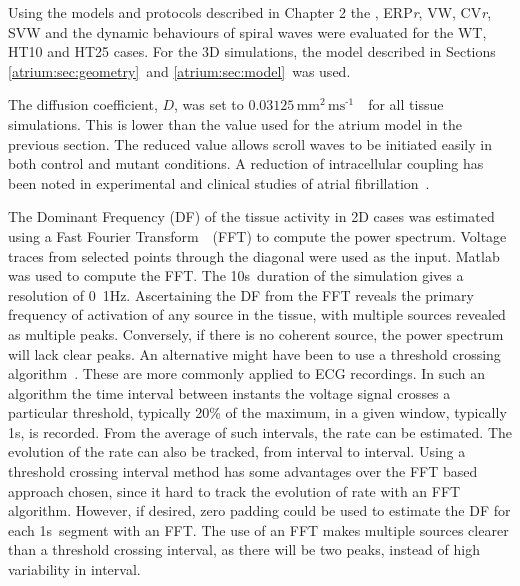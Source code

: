 Using the models and protocols described in Chapter 2 the \apdr, ERP\emph{r}, VW,
CV\emph{r}, SVW and the dynamic behaviours of spiral waves were evaluated for
the WT, HT10 and HT25 cases.
For the 3D simulations, the model described in Sections
\ref{atrium:sec:geometry}\ and \ref{atrium:sec:model}\ was used.

The diffusion coefficient, $D$, was set to
$0.03125\,\text{mm}^{\text{2}}\,\text{ms}^{\text{-1}}$~\cite{Biktasheva2005}\
for all tissue simulations.
This is lower than the value used for the atrium model in the previous section.
The reduced value allows scroll waves to be initiated easily in both control and
mutant conditions.
A reduction of intracellular coupling has been noted in experimental and
clinical studies of atrial fibrillation~\cite{Velden1998,Shaw1997}.

The Dominant Frequency (DF) of the tissue activity in 2D cases was estimated
using a Fast Fourier Transform~\cite{Zaitsev2000}\ (FFT) to compute the power
spectrum.
Voltage traces from selected points through the diagonal were used as the input.
Matlab was used to compute the FFT.
The \unit{10}{s}\ duration of the simulation gives a resolution of
\unit{0.1}{Hz}.
Ascertaining the DF from the FFT reveals the primary frequency of activation of any
source in the tissue, with multiple sources revealed as multiple peaks.
Conversely, if there is no coherent source, the power spectrum will lack clear
peaks.
An alternative might have been to use a threshold crossing
algorithm~\cite{Chen1996}.
These are more commonly applied to ECG recordings.
In such an algorithm the time interval between instants the voltage signal crosses
a particular threshold, typically 20\% of the maximum, in a given window,
typically \unit{1}{s}, is recorded.
From the average of such intervals, the rate can be estimated.
The evolution of the rate can also be tracked, from interval to interval.
Using a threshold crossing interval method has some advantages over the FFT
based approach chosen, since it hard to track the evolution of rate with an FFT
algorithm.
However, if desired, zero padding could be used to estimate the DF for
each \unit{1}{s}\ segment with an FFT.
The use of an FFT makes multiple sources clearer than a threshold crossing
interval, as there will be two peaks, instead of high variability in
interval.


